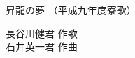 \documentclass[10pt,b5j]{tarticle} %
\begin{document}
\begin{minipage}[c]{0.7\hsize} %
    \begin{center}
        {\LARGE
            昇龍の夢 %
        }
        {\small 
            （平成九年度寮歌） %
        }
    \end{center}
\end{minipage}
\begin{minipage}[c]{0.3\hsize} %
    \begin{flushright} %
        長谷川健君 作歌\\石井英一君 作曲 %
    \end{flushright}
\end{minipage}
\end{document}
